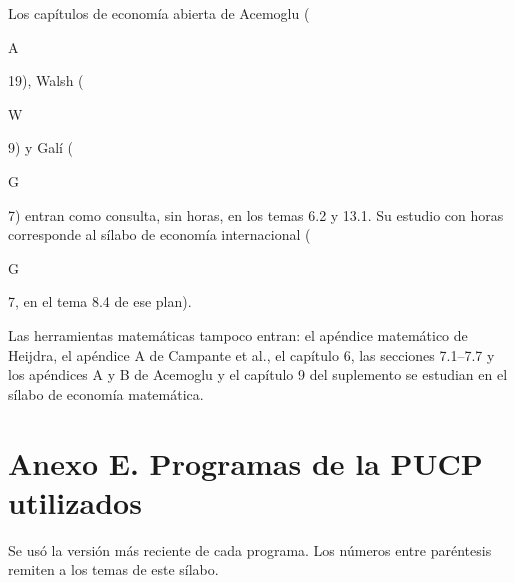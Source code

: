 \documentclass[11pt,a4paper]{article}
\newcommand{\etiqueta}[2]{%
  {\setlength{\fboxsep}{1.4pt}\colorbox{#1}{\sffamily\bfseries\color{white}\strut#2}}}
\newcommand{\AC}[1]{\etiqueta{colorA}{A}\nobreak\hspace{0.25em}\textcolor{colorA}{#1}}
\newcommand{\WA}[1]{\etiqueta{colorW}{W}\nobreak\hspace{0.25em}\textcolor{colorW}{#1}}
\newcommand{\GA}[1]{\etiqueta{colorG}{G}\nobreak\hspace{0.25em}\textcolor{colorG}{#1}}
\begin{document}
\medskip
\noindent Los capítulos de economía abierta de Acemoglu (\AC{19}), Walsh
(\WA{9}) y Galí (\GA{7}) entran como consulta, sin horas, en los temas 6.2 y
13.1. Su estudio con horas corresponde al sílabo de economía internacional
(\GA{7}, en el tema 8.4 de ese plan).

\medskip
\noindent Las herramientas matemáticas tampoco entran: el apéndice matemático de
Heijdra, el apéndice A de Campante et al., el capítulo 6, las secciones 7.1--7.7
y los apéndices A y B de Acemoglu y el capítulo 9 del suplemento se estudian en
el sílabo de economía matemática.

\newpage
\section*{Anexo E. Programas de la PUCP utilizados}

Se usó la versión más reciente de cada programa. Los números entre paréntesis
remiten a los temas de este sílabo.
\end{document}
